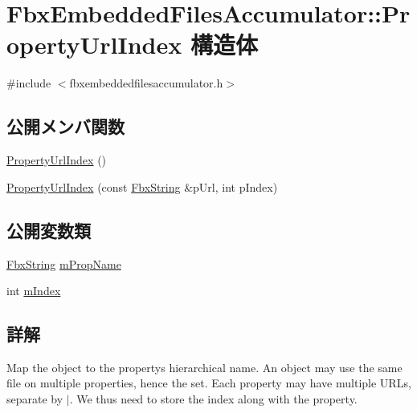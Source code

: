 \hypertarget{struct_fbx_embedded_files_accumulator_1_1_property_url_index}{}\section{Fbx\+Embedded\+Files\+Accumulator\+:\+:Property\+Url\+Index 構造体}
\label{struct_fbx_embedded_files_accumulator_1_1_property_url_index}


{\ttfamily \#include $<$fbxembeddedfilesaccumulator.\+h$>$}

\subsection*{公開メンバ関数}
\begin{DoxyCompactItemize}
\item 
\hyperlink{struct_fbx_embedded_files_accumulator_1_1_property_url_index_a54dbc08414106c317e5cd11c515d830a}{Property\+Url\+Index} ()
\item 
\hyperlink{struct_fbx_embedded_files_accumulator_1_1_property_url_index_a3deada1b726143f28d6f691ef940291a}{Property\+Url\+Index} (const \hyperlink{class_fbx_string}{Fbx\+String} \&p\+Url, int p\+Index)
\end{DoxyCompactItemize}
\subsection*{公開変数類}
\begin{DoxyCompactItemize}
\item 
\hyperlink{class_fbx_string}{Fbx\+String} \hyperlink{struct_fbx_embedded_files_accumulator_1_1_property_url_index_a33f7f4b2219d6092b5143c022e1a4d97}{m\+Prop\+Name}
\item 
int \hyperlink{struct_fbx_embedded_files_accumulator_1_1_property_url_index_a46543e7f2726226c3a2dd790aa48f0bc}{m\+Index}
\end{DoxyCompactItemize}


\subsection{詳解}
Map the object to the property\textquotesingle{}s hierarchical name. An object may use the same file on multiple properties, hence the set. Each property may have multiple U\+R\+Ls, separate by $\vert$. We thus need to store the index along with the property. 

